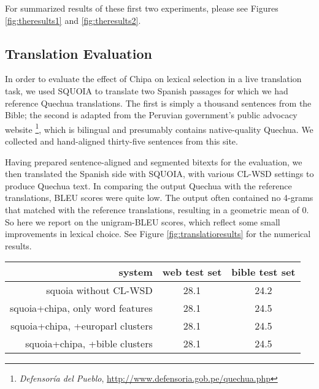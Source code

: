 \documentclass[10pt, a4paper]{article}
\begin{document}
For summarized results of these first two experiments, please see Figures
\ref{fig:theresults1} and \ref{fig:theresults2}.

\subsection{Translation Evaluation}
In order to evaluate the effect of Chipa on lexical selection in a live
translation task, we used SQUOIA to translate two Spanish passages for which we
had reference Quechua translations. The first is simply a thousand sentences
from the Bible; the second is adapted from the Peruvian government's public
advocacy website \footnote{\emph{Defensoría del Pueblo},
\url{http://www.defensoria.gob.pe/quechua.php}}, which is bilingual and
presumably contains native-quality Quechua. We collected and hand-aligned
thirty-five sentences from this site.

Having prepared sentence-aligned and segmented bitexts for the evaluation,
we then translated the Spanish side with SQUOIA, with various CL-WSD settings
to produce Quechua text. In comparing the output Quechua with the reference
translations, BLEU scores were quite low. The output often contained no 4-grams
that matched with the reference translations, resulting in a geometric mean of
0. So here we report on the unigram-BLEU scores, which reflect some small
improvements in lexical choice.
See Figure \ref{fig:translatioresults} for the numerical results.

\begin{figure*}[t!]
  \begin{center}
  \begin{tabular}{|r|c|c|}
    \hline
    system                           & web test set & bible test set  \\
    \hline
    squoia without CL-WSD            & 28.1         & 24.2            \\
    squoia+chipa, only word features & 28.1         & 24.5            \\
    squoia+chipa, +europarl clusters & 28.1         & 24.5            \\
    squoia+chipa, +bible    clusters & 28.1         & 24.5            \\
    \hline
  \end{tabular}
  \end{center}
  \caption{BLEU-1 scores (modified unigram precision) for the various CL-WSD
  settings of SQUOIA on the two different Spanish-Quechua test sets.}
\label{fig:translatioresults}
\end{figure*}
\end{document}

